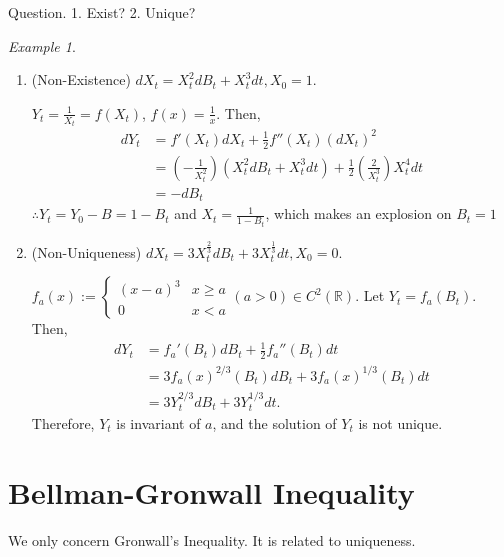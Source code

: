 \documentclass[12pt]{report}
\newcommand{\R}{\mathbb{R}}
\renewcommand{\1}{\mathbb{1}}
\theoremstyle{break}
\theoremstyle{newdef}
\theoremstyle{remark}
\newtheorem*{exmp}{Example} %
\begin{document}
Question.
1. Exist? 2. Unique?


\begin{exmp}
\leavevmode
\begin{enumerate}
\item
(Non-Existence)
$dX_t = X_t^2 dB_t + X_t^3 dt, X_0 = 1$.

$Y_t = \frac{1}{X_t} = f(X_t)$, $f(x) = \frac{1}{x}$.
Then,
$$
\begin{aligned}
dY_t
&= f'(X_t)dX_t + \frac12 f''(X_t)(dX_t)^2\\
&= \left(-\frac{1}{X_t^2}\right) (X_t^2 dB_t + X_t^3 dt) + \frac{1}{2} \left(\frac{2}{X_t^3}\right)X_t^4 dt\\
&= -dB_t
\end{aligned}
$$
$\therefore Y_t = Y_0 - B = 1-B_t$ and $X_t = \frac{1}{1-B_t}$, which makes an explosion on $B_t = 1$

\item
(Non-Uniqueness)
$dX_t = 3X_t^{\frac{2}{3}}dB_t + 3X_t^{\frac{1}{3}}dt, X_0 = 0$.

$f_a(x) :=
\begin{cases}
(x-a)^3 & x \geq a\\
0 & x < a
\end{cases}
(a > 0)
\in C^2(\R)
$.
Let $Y_t = f_a(B_t)$. Then,
$$
\begin{aligned}
dY_t
&= f_a'(B_t)dB_t + \frac{1}{2}f_a''(B_t)dt\\
&= 3f_a(x)^{2/3}(B_t)dB_t + 3 f_a(x)^{1/3}(B_t)dt\\
&= 3Y_t^{2/3}dB_t + 3Y_t^{1/3}dt.
\end{aligned}
$$
Therefore, $Y_t$ is invariant of $a$, and the solution of $Y_t$ is not unique.
\end{enumerate}
\end{exmp}


\section{Bellman-Gronwall Inequality}
We only concern Gronwall's Inequality. It is related to uniqueness.
\end{document}
